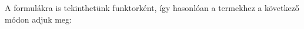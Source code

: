 A formulákra is tekinthetünk funktorként, így hasonlóan a termekhez a következő módon adjuk meg:
\begin{code}%
%
\>[6]\AgdaSpace{}%
\AgdaSymbol{:}\AgdaSpace{}%
\AgdaSpace{}%
\AgdaSpace{}%
\AgdaSpace{}%
\<%
\\
%
\>[6]\AgdaSpace{}%
\AgdaSymbol{:}\AgdaSpace{}%
\AgdaSpace{}%
\AgdaSymbol{\}}\AgdaSpace{}%
\AgdaSpace{}%
\AgdaSpace{}%
\AgdaSpace{}%
\AgdaSpace{}%
\AgdaSpace{}%
\AgdaSpace{}%
\AgdaSpace{}%
\AgdaSpace{}%
\AgdaSpace{}%
\<%
\\
%
\>[6]%
\>[12]\AgdaSymbol{:}%
\>[289I]\AgdaSpace{}%
\AgdaSpace{}%
\AgdaSymbol{\}\{}\AgdaSpace{}%
\AgdaSymbol{:}\AgdaSpace{}%
\AgdaSpace{}%
\AgdaSymbol{\}\{}\AgdaSpace{}%
\AgdaSymbol{:}\AgdaSpace{}%
\AgdaSpace{}%
\AgdaSpace{}%
\AgdaSymbol{\}\{}\AgdaSpace{}%
\AgdaSymbol{:}\AgdaSpace{}%
\AgdaSpace{}%
\AgdaSpace{}%
\AgdaSymbol{\}}\<%
\\
\>[.][@{}l@{}]\<[289I]%
\>[14]\AgdaSpace{}%
\AgdaSpace{}%
\AgdaOperator{\AgdaField{[}}\AgdaSpace{}%
\AgdaSpace{}%
\AgdaSpace{}%
\AgdaSpace{}%
\AgdaOperator{\AgdaField{]ᶠ}}\AgdaSpace{}%
\AgdaSpace{}%
\AgdaSpace{}%
\AgdaOperator{\AgdaField{[}}\AgdaSpace{}%
\AgdaSpace{}%
\AgdaOperator{\AgdaField{]ᶠ}}\AgdaSpace{}%
\AgdaOperator{\AgdaField{[}}\AgdaSpace{}%
\AgdaSpace{}%
\AgdaOperator{\AgdaField{]ᶠ}}\<%
\\
%
\>[6]\AgdaSpace{}%
\AgdaSymbol{:}\AgdaSpace{}%
\AgdaSymbol{\}\{}\AgdaSpace{}%
\AgdaSymbol{:}\AgdaSpace{}%
\AgdaSpace{}%
\AgdaSymbol{\}}\AgdaSpace{}%
\AgdaSpace{}%
\AgdaSpace{}%
\AgdaOperator{\AgdaField{[}}\AgdaSpace{}%
\AgdaSpace{}%
\AgdaOperator{\AgdaField{]ᶠ}}\AgdaSpace{}%
\AgdaSpace{}%
\<%
\end{code}

